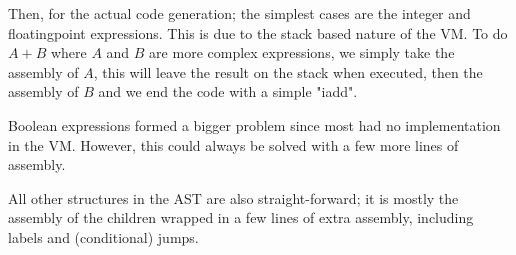 \documentclass[a4paper,11pt]{report}
\begin{document}
Then, for the actual code generation; the simplest cases are the integer and floatingpoint expressions.
This is due to the stack based nature of the VM. To do $A+B$ where $A$ and $B$ are more complex expressions, we simply take the assembly of $A$, this will leave the result on the stack when executed, then the assembly of $B$ and we end the code with a simple "iadd".

Boolean expressions formed a bigger problem since most had no implementation in the VM. However, this could always be solved with a few more lines of assembly.

All other structures in the AST are also straight-forward; it is mostly the assembly of the children wrapped in a few lines of extra assembly, including labels and (conditional) jumps.
\end{document}
